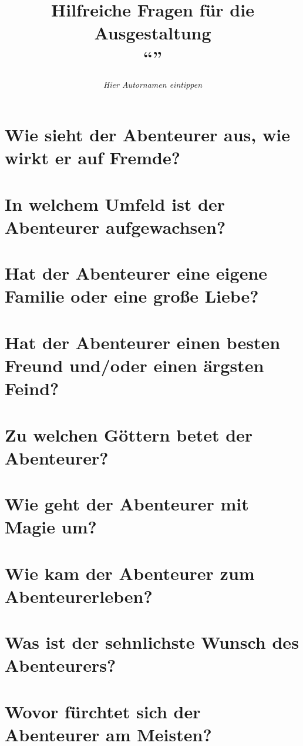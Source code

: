 \documentclass{article}
\author{\textit{Hier Autornamen eintippen}}
\title{Hilfreiche Fragen für die Ausgestaltung \\ \enquote{\charactername} }
\begin{document}
	\maketitle
	
	\tableofcontents
	
	\section[Aussehen]{Wie sieht der Abenteurer aus, wie wirkt er auf Fremde?}
	
	\section[Soziales Umfeld]{In welchem Umfeld ist der Abenteurer aufgewachsen?}
	
	\section[Beziehungsstatus]{Hat der Abenteurer eine eigene Familie oder eine große Liebe?}

	\section[Freund und Feind]{Hat der Abenteurer einen besten Freund und/oder einen ärgsten Feind?}

	\section[Religion]{Zu welchen Göttern betet der Abenteurer?}
	
	\section[Magie]{Wie geht der Abenteurer mit Magie um?}

	\section[Schicksal]{Wie kam der Abenteurer zum Abenteurerleben?}

	\section[Antrieb]{Was ist der sehnlichste Wunsch des Abenteurers?}

	\section[Ängste]{Wovor fürchtet sich der Abenteurer am Meisten?}
\end{document}
